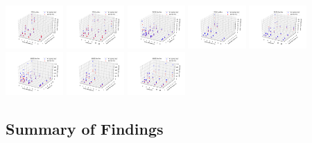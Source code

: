 \documentclass[11pt,a4paper]{article}
\begin{document}
\includegraphics[width=2.2cm]{256-cpusPerTask-tasksPerNode}
\includegraphics[width=2.2cm]{256-nodes-tasksPerNode}
\includegraphics[width=2.2cm]{1024-cpusPerTask-nodes}
\includegraphics[width=2.2cm]{1024-cpusPerTask-tasksPerNode}
\includegraphics[width=2.2cm]{1024-nodes-tasksPerNode}
\includegraphics[width=2.2cm]{4096-cpusPerTask-nodes}
\includegraphics[width=2.2cm]{4096-cpusPerTask-tasksPerNode}
\includegraphics[width=2.2cm]{4096-nodes-tasksPerNode}


\subsection*{Summary of Findings}
\end{document}
